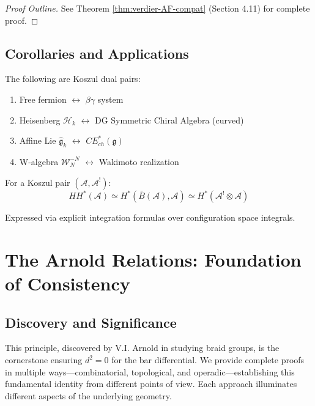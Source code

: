 \begin{proof}[Proof Outline]
See Theorem \ref{thm:verdier-AF-compat} (Section 4.11) for complete proof.
\end{proof}

\subsection{Corollaries and Applications}

\begin{corollary}\label{cor:explicit-pairs-intro}
The following are Koszul dual pairs:
\begin{enumerate}
\item Free fermion $\leftrightarrow$ $\beta\gamma$ system
\item Heisenberg $\mathcal{H}_k$ $\leftrightarrow$ DG Symmetric Chiral Algebra (curved)
\item Affine Lie $\widehat{\mathfrak{g}}_k$ $\leftrightarrow$ $CE_{ch}^*(\mathfrak{g})$ 

\item W-algebra $\mathcal{W}_N^{-N}$ $\leftrightarrow$ Wakimoto realization
\end{enumerate}
\end{corollary}

\begin{corollary}\label{cor:hochschild-computation-intro}
For a Koszul pair $(\mathcal{A}, \mathcal{A}^!)$:
$$HH^*(\mathcal{A}) \simeq H^*(\bar{B}(\mathcal{A}), \mathcal{A}) 
\simeq H^*(\mathcal{A}^! \otimes \mathcal{A})$$

Expressed via explicit integration formulas over configuration space integrals.
\end{corollary}

\section{The Arnold Relations: Foundation of Consistency}

\subsection{Discovery and Significance}

This principle, discovered by V.I. Arnold in studying braid groups, is the cornerstone ensuring $d^2 = 0$ for the bar differential. We provide complete proofs in multiple ways—combinatorial, topological, and operadic—establishing this fundamental identity from different points of view. Each approach illuminates different aspects of the underlying geometry.

